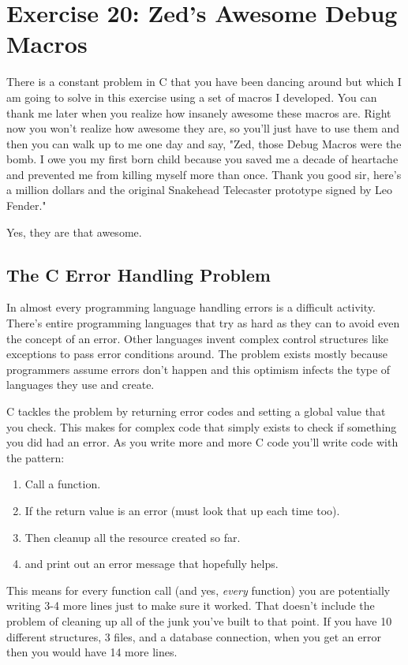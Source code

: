 \chapter{Exercise 20: Zed's Awesome Debug Macros}

There is a constant problem in C that you have been dancing around but which I
am going to solve in this exercise using a set of macros I developed.  You can
thank me later when you realize how insanely awesome these macros are.  Right
now you won't realize how awesome they are, so you'll just have to use them and
then you can walk up to me one day and say, "Zed, those Debug Macros were the
bomb. I owe you my first born child because you saved me a decade of heartache
and prevented me from killing myself more than once. Thank you good sir, here's
a million dollars and the original Snakehead Telecaster prototype signed by Leo
Fender."

Yes, they are that awesome.

\section{The C Error Handling Problem}

In almost every programming language handling errors is a difficult activity.
There's entire programming languages that try as hard as they can to avoid even
the concept of an error.  Other languages invent complex control structures
like exceptions to pass error conditions around.  The problem exists mostly
because programmers assume errors don't happen and this optimism infects the
type of languages they use and create.

C tackles the problem by returning error codes and setting a global
 value that you check.  This makes for complex code that
simply exists to check if something you did had an error.  As you 
write more and more C code you'll write code with the pattern:

\begin{enumerate}
\item Call a function.
\item If the return value is an error (must look that up each time too).
\item Then cleanup all the resource created so far.
\item and print out an error message that hopefully helps.
\end{enumerate}

This means for every function call (and yes, \emph{every} function)
you are potentially writing 3-4 more lines just to make sure it worked.
That doesn't include the problem of cleaning up all of the junk you've
built to that point.  If you have 10 different structures, 3 files, and
a database connection, when you get an error then you
would have 14 more lines.

